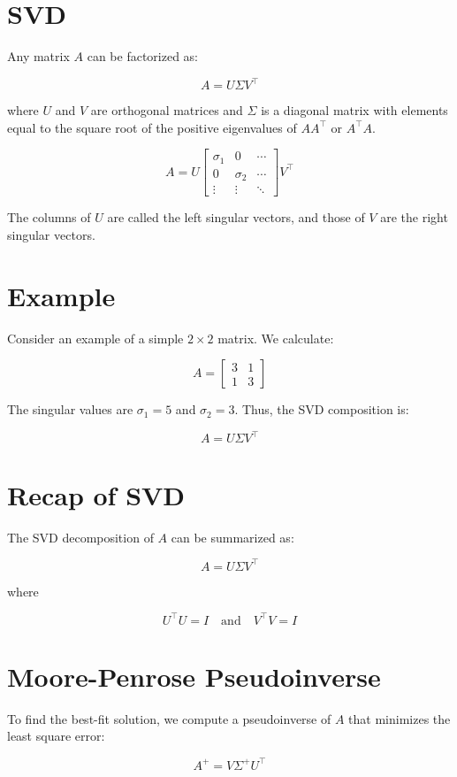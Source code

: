 \documentclass{ximera}
\begin{document}
\begin{problem}
\begin{problem}
\section{SVD}
Any matrix \(A\) can be factorized as:

\[
A = U \Sigma V^\top
\]

where \(U\) and \(V\) are orthogonal matrices and \(\Sigma\) is a diagonal matrix with elements equal to the square root of the positive eigenvalues of \(AA^\top\) or \(A^\top A\).

\[
A = U \begin{bmatrix} \sigma_1 & 0 & \cdots \\ 0 & \sigma_2 & \cdots \\ \vdots & \vdots & \ddots \end{bmatrix} V^\top
\]

The columns of \(U\) are called the left singular vectors, and those of \(V\) are the right singular vectors.

\section{Example}
Consider an example of a simple \(2 \times 2\) matrix. We calculate:

\[
A = \begin{bmatrix} 3 & 1 \\ 1 & 3 \end{bmatrix}
\]

The singular values are \(\sigma_1 = 5\) and \(\sigma_2 = 3\). Thus, the SVD composition is:

\[
A = U \Sigma V^\top
\]

\section{Recap of SVD}
The SVD decomposition of \(A\) can be summarized as:

\[
A = U \Sigma V^\top
\]

where

\[
U^\top U = I \quad \text{and} \quad V^\top V = I
\]

\section{Moore-Penrose Pseudoinverse}
To find the best-fit solution, we compute a pseudoinverse of \(A\) that minimizes the least square error:

\[
A^+ = V \Sigma^+ U^\top
\]


\end{problem}
\end{problem}
\end{document}

